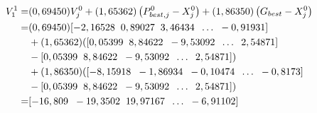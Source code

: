 {{\begin{enumerate}[align = left, left = 0cm, nolistsep]
                  {
                      \begin{equation*}
                          \begin{aligned}
                              V_{1}^{1}  = & (0,69450)V_{j}^{0} + (1,65362)\left(P_{best,j}^{0}-X_{j}^{0}\right) + (1,86350)\left(G_{best}-X_{j}^{0}\right) \\
                              =            & (0,69450)[-2,16528\hspace{2mm}	0,89027\hspace{2mm}	3,46434\hspace{2mm} \dots\hspace{2mm}   -0,91931 ]          \\
                                           & + (1,65362)([0,05399\hspace{2mm}	8,84622\hspace{2mm}	-9,53092\hspace{2mm} \dots\hspace{2mm} 2,54871 ]          \\
                                           & - [0,05399\hspace{2mm}	8,84622\hspace{2mm}	-9,53092\hspace{2mm} \dots\hspace{2mm} 2,54871])                    \\
                                           & + (1,86350)([-8,15918\hspace{2mm}	-1,86934\hspace{2mm}	-0,10474\hspace{2mm} \dots \hspace{2mm} -0,8173]        \\
                                           & - [0,05399\hspace{2mm}	8,84622\hspace{2mm}	-9,53092\hspace{2mm} \dots\hspace{2mm} 2,54871])                    \\
                              =            & [-16,809\hspace{2mm} -19,3502\hspace{2mm} 19,97167\hspace{2mm} \dots \hspace{2mm} -6,91102]
                          \end{aligned}
                      \end{equation*}
                  }


\end{enumerate}}}
